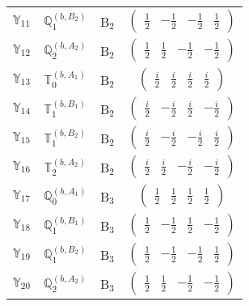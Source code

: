 \documentclass[fleqn,10pt,landscape]{article}
\begin{document}
\begin{itemize}
\begin{center}
\begin{longtable}{c|c|c|c}
$ \mathbb{Y}_{11} $ & $\mathbb{Q}_{1}^{(b,B_{2})}$ & B$_{2}$ & $\begin{pmatrix} \frac{1}{2} & - \frac{1}{2} & - \frac{1}{2} & \frac{1}{2} \end{pmatrix}$ \\
$ \mathbb{Y}_{12} $ & $\mathbb{Q}_{2}^{(b,A_{2})}$ & B$_{2}$ & $\begin{pmatrix} \frac{1}{2} & \frac{1}{2} & - \frac{1}{2} & - \frac{1}{2} \end{pmatrix}$ \\
$ \mathbb{Y}_{13} $ & $\mathbb{T}_{0}^{(b,A_{1})}$ & B$_{2}$ & $\begin{pmatrix} \frac{i}{2} & \frac{i}{2} & \frac{i}{2} & \frac{i}{2} \end{pmatrix}$ \\
$ \mathbb{Y}_{14} $ & $\mathbb{T}_{1}^{(b,B_{1})}$ & B$_{2}$ & $\begin{pmatrix} \frac{i}{2} & - \frac{i}{2} & \frac{i}{2} & - \frac{i}{2} \end{pmatrix}$ \\
$ \mathbb{Y}_{15} $ & $\mathbb{T}_{1}^{(b,B_{2})}$ & B$_{2}$ & $\begin{pmatrix} \frac{i}{2} & - \frac{i}{2} & - \frac{i}{2} & \frac{i}{2} \end{pmatrix}$ \\
$ \mathbb{Y}_{16} $ & $\mathbb{T}_{2}^{(b,A_{2})}$ & B$_{2}$ & $\begin{pmatrix} \frac{i}{2} & \frac{i}{2} & - \frac{i}{2} & - \frac{i}{2} \end{pmatrix}$ \\ \hline
$ \mathbb{Y}_{17} $ & $\mathbb{Q}_{0}^{(b,A_{1})}$ & B$_{3}$ & $\begin{pmatrix} \frac{1}{2} & \frac{1}{2} & \frac{1}{2} & \frac{1}{2} \end{pmatrix}$ \\
$ \mathbb{Y}_{18} $ & $\mathbb{Q}_{1}^{(b,B_{1})}$ & B$_{3}$ & $\begin{pmatrix} \frac{1}{2} & - \frac{1}{2} & \frac{1}{2} & - \frac{1}{2} \end{pmatrix}$ \\
$ \mathbb{Y}_{19} $ & $\mathbb{Q}_{1}^{(b,B_{2})}$ & B$_{3}$ & $\begin{pmatrix} \frac{1}{2} & - \frac{1}{2} & - \frac{1}{2} & \frac{1}{2} \end{pmatrix}$ \\
$ \mathbb{Y}_{20} $ & $\mathbb{Q}_{2}^{(b,A_{2})}$ & B$_{3}$ & $\begin{pmatrix} \frac{1}{2} & \frac{1}{2} & - \frac{1}{2} & - \frac{1}{2} \end{pmatrix}$ \\

\end{longtable}
\end{center}
\end{itemize}
\end{document}

